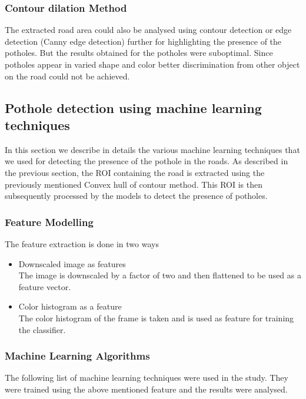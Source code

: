 \documentclass[journal]{IEEEtran}
\begin{document}
\vspace*{.5cm}

\subsubsection*{Contour dilation Method}
The extracted road area could also be analysed using contour detection or edge detection (Canny edge detection) further for highlighting the presence of the potholes. But the results obtained for the potholes were sub\-optimal. Since potholes appear in varied shape and color better discrimination from other object on the road could not be achieved. 

\subsection{Pothole detection using machine learning techniques}

In this section we describe in details the various machine learning techniques that we used for detecting the presence of the pothole in the roads. As described in the previous section, the ROI containing the road is extracted using the previously mentioned Convex hull of contour method. This ROI is then subsequently processed by the models to detect the presence of potholes.

\subsubsection{Feature Modelling}

The feature extraction is done in two ways 
\begin{itemize}
\item Downscaled image as features \\
The image is downscaled by a factor of two and then flattened to be used as a feature vector.
\item Color histogram as a feature \\
The color histogram of the frame is taken and is used as feature for training the classifier.
\end{itemize}


\subsubsection{Machine Learning Algorithms}

The following list of machine learning techniques were used in the study. They were trained using the above mentioned feature and the results were analysed.
\end{document}
